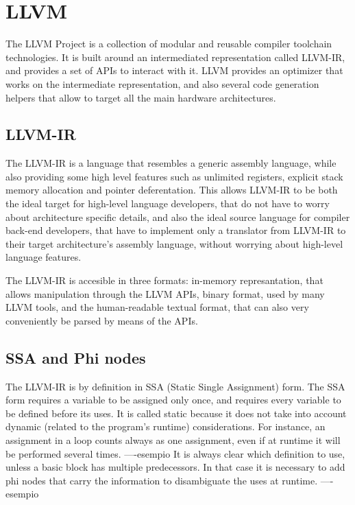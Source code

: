 
\section{LLVM}
The LLVM Project \cite{llvm} is a collection of modular and reusable compiler toolchain technologies. It is built around an intermediated representation called LLVM-IR, and provides a set of APIs to interact with it. LLVM provides an optimizer that works on the intermediate representation, and also several code generation helpers that allow to target all the main hardware architectures.
\subsection{LLVM-IR}
The LLVM-IR is a language that resembles a generic assembly language, while also providing some high level features such as unlimited registers, explicit stack memory allocation and pointer deferentation.
This allows LLVM-IR to be both the ideal target for high-level language developers, that do not have to worry about architecture specific details, and also the ideal source language for compiler back-end developers, that have to implement only a translator from LLVM-IR to their target architecture's assembly language, without worrying about high-level language features. \par
The LLVM-IR is accesible in three formats: in-memory represantation, that allows manipulation through the LLVM APIs, binary format, used by many LLVM tools, and the human-readable textual format, that can also very conveniently be parsed by means of the APIs.

\subsection{SSA and Phi nodes}
The LLVM-IR is by definition in SSA (Static Single Assignment) form. The SSA form requires a variable to be assigned only once, and requires every variable to be defined before its uses. It is called static because it does not take into account dynamic (related to the program's runtime) considerations. For instance, an assignment in a loop counts always as one assignment, even if at runtime it will be performed several times.\newline
----esempio \newline
It is always clear which definition to use, unless a basic block has multiple predecessors. In that case it is necessary to add phi nodes that carry the information to disambiguate the uses at runtime.\newline
----esempio
\newline

